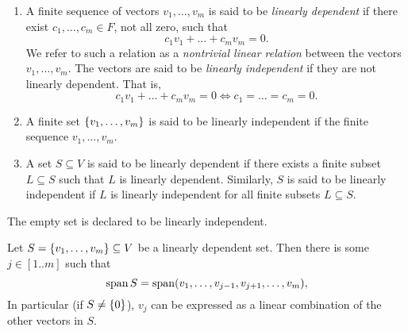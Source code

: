 
\begin{defn} \label{defn:vector:linear_independence}
    \begin{enumerate}[label=(\alph*)]
        \item A finite sequence of vectors $v_{1}, \dots, v_{m}$ is said to be \emph{linearly dependent} if there exist $c_{1}, \dots, c_{m} \in F$, not all zero, such that \[
            c_{1} v_{1} + \dots + c_{m} v_{m} = 0.
        \] We refer to such a relation as a \emph{nontrivial linear relation} between the vectors $v_{1}, \dots, v_{m}$.
        The vectors are said to be \emph{linearly independent} if they are not linearly dependent.
        That is, \[
            c_{1} v_{1} + \dots + c_{m} v_{m} = 0 \iff c_{1} = \dots = c_{m} = 0.
        \]
        \item A finite set $\set{v_{1}, \dots, v_{m}}$ is said to be linearly independent if the finite sequence $v_{1}, \dots, v_{m}$.
        \item A set $S \subseteq V$ is said to be linearly dependent if there exists a finite subset $L \subseteq S$ such that $L$ is linearly dependent.
        Similarly, $S$ is said to be linearly independent if $L$ is linearly independent for all finite subsets $L \subseteq S$.
    \end{enumerate}

    The empty set is declared to be linearly independent.
\end{defn}

\begin{prop}[] \label{thm:vector:redundancy}
    Let $S = \set{v_{1}, \dots, v_{m}} \subseteq V$ be a linearly dependent set.
    Then there is some $j \in [1 .. m]$ such that \[
        \operatorname{span} S = \operatorname{span}(v_{1}, \dots, v_{j-1}, v_{j+1}, \dots, v_{m}),
    \]
    In particular (if $S \neq \set{0}$), $v_{j}$ can be expressed as a linear combination of the other vectors in $S$.
\end{prop}
